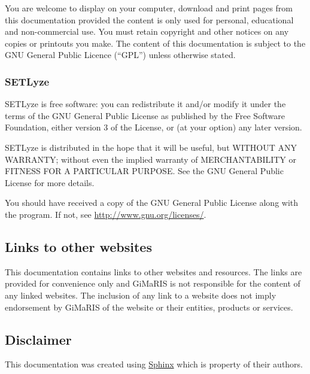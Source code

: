 \documentclass[letterpaper,10pt,english]{sphinxmanual}
\begin{document}
You are welcome to display on your computer, download and print pages
from this documentation provided the content is only used for personal,
educational and non-commercial use. You must retain copyright and other
notices on any copies or printouts you make. The content of this
documentation is subject to the GNU General Public Licence (``GPL'')
unless otherwise stated.


\subsubsection{SETLyze}
\label{legal:setlyze}
SETLyze is free software: you can redistribute it and/or modify
it under the terms of the GNU General Public License as published by
the Free Software Foundation, either version 3 of the License, or
(at your option) any later version.

SETLyze is distributed in the hope that it will be useful,
but WITHOUT ANY WARRANTY; without even the implied warranty of
MERCHANTABILITY or FITNESS FOR A PARTICULAR PURPOSE.  See the
GNU General Public License for more details.

You should have received a copy of the GNU General Public License
along with the program.  If not, see \href{http://www.gnu.org/licenses/}{http://www.gnu.org/licenses/}.


\subsection{Links to other websites}
\label{legal:links-to-other-websites}
This documentation contains links to other websites and resources. The
links are provided for convenience only and GiMaRIS is not responsible
for the content of any linked websites. The inclusion of any link to a
website does not imply endorsement by GiMaRIS of the website or their
entities, products or services.


\subsection{Disclaimer}
\label{legal:disclaimer}
This documentation was created using \href{http://sphinx.pocoo.org/}{Sphinx}
which is property of their authors.
\end{document}
